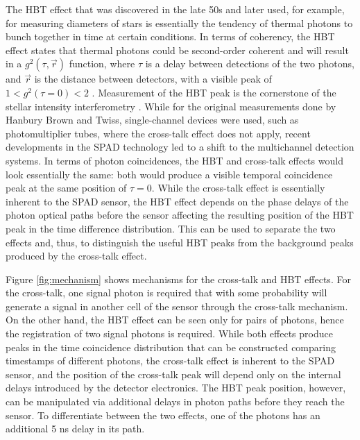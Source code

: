 \documentclass[a4paper,11pt]{article}
\begin{document}
The HBT effect that was discovered in the late 50s and later used, for example, for measuring diameters of stars \cite{brown1958interferometry2, brown1958interferometry3, hanbury1979test} is essentially the tendency of thermal photons 
to bunch together in time at certain conditions. In terms of coherency, the HBT effect states that thermal photons could be second-order coherent and will result in a $g^{2}(\tau, \Vec{r})$ function, where $\tau$ is a delay between detections of the two photons, and $\Vec{r}$ is the distance between detectors, with a visible peak of $1 < g^{2}(\tau=0) < 2$ \cite{loudon2000quantum}. Measurement of the HBT peak is the cornerstone of the stellar intensity interferometry \cite{walter2023resolving, guerin2017temporal, guerin2018spatial, rivet2020intensity, abeysekara2020demonstration, de2022combined, karl2024photon}. While for the original measurements done by Hanbury Brown and Twiss, single-channel devices were used, such as photomultiplier tubes, where the cross-talk effect does not apply, recent developments in the SPAD technology led to a shift to the multichannel detection systems. In terms of photon coincidences, the HBT and cross-talk effects would look essentially the same: both would produce a visible temporal coincidence peak at the same position of $\tau=0$. While the cross-talk effect is essentially inherent to the SPAD sensor, the HBT effect depends on the phase delays of the photon optical paths before the sensor affecting the resulting position of the HBT peak in the time difference distribution. This can be used to separate the two effects and, thus, to distinguish the useful HBT peaks from the background peaks produced by the cross-talk effect.

Figure \ref{fig:mechanism} shows mechanisms for the cross-talk and HBT effects. For the cross-talk, one signal photon is required that with some probability will generate a signal in another cell of the sensor through the cross-talk mechanism. On the other hand, the HBT effect can be seen only for pairs of photons, hence the registration of two signal photons is required. While both effects produce peaks in the time coincidence distribution that can be constructed comparing timestamps of different photons, the cross-talk effect is inherent to the SPAD sensor, and the position of the cross-talk peak will depend only on the internal delays introduced by the detector electronics. The HBT peak position, however, can be manipulated via additional delays in photon paths before they reach the sensor. 
To differentiate between the two effects, one of the photons has an additional 5 ns delay in its path.
\end{document}
